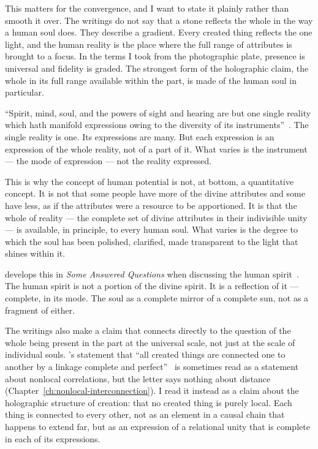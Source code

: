 This matters for the convergence, and I want to state it plainly rather than smooth it over.
The writings do not say that a stone reflects the whole in the way a human soul does.
They describe a gradient.
Every created thing reflects the one light, and the human reality is the place where the full range of attributes is brought to a focus.
In the terms I took from the photographic plate, presence is universal and fidelity is graded.
The strongest form of the holographic claim, the whole in its full range available within the part, is made of the human soul in particular.

``Spirit, mind, soul, and the powers of sight and hearing are but one single reality which hath manifold expressions owing to the diversity of its instruments''~\citep[para.~35]{SummonsLordHosts}.
The single reality is one.
Its expressions are many.
But each expression is an expression of the whole reality, not of a part of it.
What varies is the instrument --- the mode of expression --- not the reality expressed.

This is why the \bahai concept of human potential is not, at bottom, a quantitative concept.
It is not that some people have more of the divine attributes and some have less, as if the attributes were a resource to be apportioned.
It is that the whole of reality --- the complete set of divine attributes in their indivisible unity --- is available, in principle, to every human soul.
What varies is the degree to which the soul has been polished, clarified, made transparent to the light that shines within it.

\AbdulBaha develops this in \emph{Some Answered Questions} when discussing the human spirit~\citep[Part 4]{SAQ}.
The human spirit is not a portion of the divine spirit.
It is a reflection of it --- complete, in its mode.
The soul as a complete mirror of a complete sun, not as a fragment of either.

The \bahai writings also make a claim that connects directly to the question of the whole being present in the part at the universal scale, not just at the scale of individual souls.
\AbdulBaha's statement that ``all created things are connected one to another by a linkage complete and perfect''~\citep[\S 21]{SelectionsAbdul} is sometimes read as a statement about nonlocal correlations, but the letter says nothing about distance (Chapter~\ref{ch:nonlocal-interconnection}).
I read it instead as a claim about the holographic structure of creation: that no created thing is purely local.
Each thing is connected to every other, not as an element in a causal chain that happens to extend far, but as an expression of a relational unity that is complete in each of its expressions.

